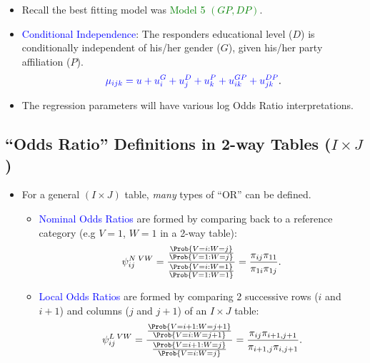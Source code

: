 \documentclass{article}\usepackage[]{graphicx}\usepackage[svgnames]{xcolor}
\providecommand\given{} %
\renewcommand\given{\nonscript\:\delimsize\vert\nonscript\:\mathopen{}}%
\renewcommand\given{\nonscript\:\delimsize\vert\nonscript\:\mathopen{}}%
\renewcommand\given{\nonscript\:\delimsize\vert\nonscript\:\mathopen{}}%
\renewcommand\given{\nonscript\:\delimsize\vert\nonscript\:\mathopen{}}%
\renewcommand\given{\nonscript\:\delimsize\vert\nonscript\:\mathopen{}}%
\renewcommand\given{\nonscript\:\delimsize\vert\nonscript\:\mathopen{}}%
\renewcommand\given{\nonscript\:\delimsize\vert\nonscript\:\mathopen{}}%
\renewcommand\given{\nonscript\:\delimsize\vert\nonscript\:\mathopen{}}%
\renewcommand\given{\nonscript\:\delimsize\vert\nonscript\:\mathopen{}}%
\renewcommand\given{\nonscript\:\delimsize\vert\nonscript\:\mathopen{}}%
\renewcommand\given{\nonscript\:\delimsize\vert\nonscript\:\mathopen{}}%
\let\log\relax%
\renewcommand\given{:}
\begin{document}
\begin{itemize}
    \item Recall the best fitting model was \textcolor{Green}{Model 5 $ (GP,DP) $}.
    \item \textcolor{Blue}{Conditional Independence}: The responders educational level ($D$) is conditionally
          independent of his/her gender ($G$), given his/her party affiliation ($P$).
          \[ \textcolor{Blue}{\log{\mu_{ijk}}=u+u_i^G+u_j^D+u_k^P+u_{ik}^{GP}+u_{jk}^{DP}}. \]
    \item The regression parameters will have various log Odds Ratio interpretations.
\end{itemize}
\subsection*{``Odds Ratio'' Definitions in 2-way Tables ($I \times J$)}
\begin{itemize}
    \item For a general $ (I\times J) $ table, \emph{many} types of ``OR'' can be defined.
          \begin{itemize}
              \item \textcolor{Blue}{Nominal Odds Ratios} are formed by comparing back to a reference category (e.g
                    $V = 1$, $W = 1$ in a 2-way table):
                    \[ \psi_{ij}^{N\;VW}
                        =\frac{\frac{\Prob{V=i\given W=j}}{\Prob{V=1\given W=j}}}{\frac{\Prob{V=i\given W=1}}{\Prob{V=1\given W=1}}}
                        =\frac{\pi_{ij}\pi_{11}}{\pi_{1i}\pi_{1j}}. \]
              \item \textcolor{Blue}{Local Odds Ratios} are formed by comparing 2 successive rows ($ i $ and $ i+1 $) and columns
                    ($ j $ and $ j+1 $) of an $ I\times J $ table:
                    \[ \psi_{ij}^{L\;VW}
                        =\frac{\frac{\Prob{V=i+1\given W=j+1}}{\Prob{V=i\given W=j+1}}}{\frac{\Prob{V=i+1\given W=j}}{\Prob{V=i\given W=j}}}
                        =\frac{\pi_{ij}\pi_{i+1,j+1}}{\pi_{i+1,j}\pi_{i,j+1}}. \]
          \end{itemize}
\end{itemize}
\end{document}
